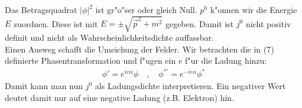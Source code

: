 \documentclass[11pt,a4paper]{article}
\begin{document}
Das Betragsquadrat $|\phi|^2$ ist gr"o"ser oder gleich Null. $p^0$ k"onnen wir die Energie $E$ zuordnen. Diese ist mit $E=\pm\sqrt{\vec{p}^{ 2} + m^2}$ gegeben. Damit ist $j^0$ nicht positiv definit und nicht als Wahrscheinlichkeitsdichte auffassbar.\\
Einen Ausweg schafft die Umeichung der Felder. Wir betrachten die in (7) definierte Phasentransformation und f"ugen ein $e$ f"ur die Ladung hinzu:
\begin{eqnarray}
\phi' = e^{ie\alpha}\phi \quad,\quad \phi^{*\prime} = e^{-ie\alpha}\phi^*
\end{eqnarray}
Damit kann man nun $j^0$ als Ladungsdichte interpretieren. Ein negativer Wert deutet damit nur auf eine negative Ladung (z.B. Elektron) hin.
\end{document}
